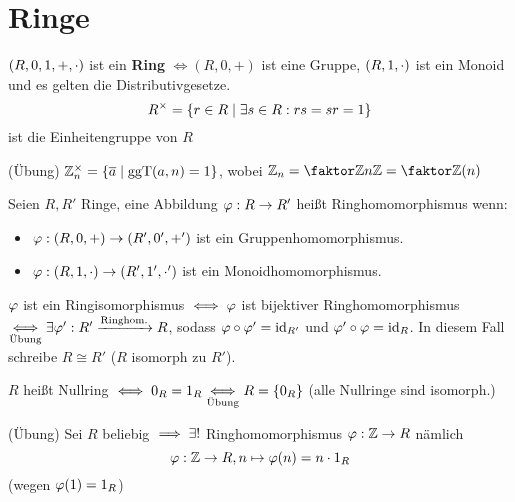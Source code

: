 \documentclass[a4paper]{report}
\begin{document}
\section{Ringe}
\begin{whg*}
  $(R, 0, 1, +, \cd)$ ist ein \textbf{Ring} $\iff (R, 0, +)$ ist eine Gruppe, $(R, 1, \cd)$ ist ein Monoid und es gelten die Distributivgesetze.
  \[R^{\tm} = \{r \in R \mid \ex s \in R : rs = sr = 1\}\]
  ist die Einheitengruppe von $R$
\end{whg*}
\begin{bsp*}
(Übung) $\Zn\en = \{\bar a \mid \ggt(a, n) = 1\}$, wobei $\Zn = \fak \Z{n\Z} = \fak {\Z} {(n)}$
\end{bsp*}

\begin{defi}
  Seien $R, R'$ Ringe, eine Abbildung $\ph : R \to R'$ heißt Ringhomomorphismus wenn:
  \begin{itemize}
    \item $\ph : (R, 0, +) \to (R', 0', +')$ ist ein Gruppenhomomorphismus.
    \item $\ph : (R, 1, \cd) \to (R', 1', \cd')$ ist ein Monoidhomomorphismus.
  \end{itemize}
  $\ph$ ist ein Ringisomorphismus $\iff \ph$ ist bijektiver Ringhomomorphismus $\underset{\text{Übung}}\iff \ex \ph': R' \xrightarrow{\text{Ringhom.}} R$, sodass $\ph \circ \ph' = \id_{R'}$ und $\ph' \circ \ph = \id_{R}$. In diesem Fall schreibe $R \cong R'$ ($R$ isomorph zu $R'$).
\end{defi}
\begin{bsp*} $R$ heißt Nullring $\iff 0_{R} = 1_{R} \ueb\iff R = \{0_{R}\}$ (alle Nullringe sind isomorph.)
\end{bsp*}
\begin{bsp*}(Übung)
  Sei $R$ beliebig $\imp \ex!$ Ringhomomorphismus $\ph: \Z \to R$ nämlich
  \[\ph : \Z \to R, n \mapsto \ph(n) = n\cdot 1_{R}\]
  (wegen $\ph(1) = 1_{R}$)
\end{bsp*}
\end{document}
